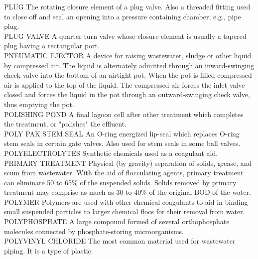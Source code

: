 \documentclass{article}
\begin{document}
PLUG
The rotating closure element of a plug valve. Also a threaded fitting used to close off and seal an opening into a pressure containing chamber, e.g., pipe plug.
\vspace{0.3cm}\\
PLUG VALVE
A quarter turn valve whose closure element is usually a tapered plug having a rectangular port.
\vspace{0.3cm}\\
PNEUMATIC EJECTOR
A device for raising wastewater, sludge or other liquid by compressed air. The liquid is alternately admitted through an inward-swinging check valve into the bottom of an airtight pot. When the pot is filled compressed air is applied to the top of the liquid. The compressed air forces the inlet valve closed and forces the liquid in the pot through an outward-swinging check valve, thus emptying the pot. 
\vspace{0.3cm}\\
POLISHING POND
A final lagoon cell after other treatment which completes the treatment, or "polishes" the effluent.
\vspace{0.3cm}\\
POLY PAK STEM SEAL
An O-ring energized lip-seal which replaces O-ring stem seals in certain gate valves. Also used for stem seals in some ball valves.
\vspace{0.3cm}\\
POLYELECTROLYTES
Synthetic chemicals used as a coagulant aid.
\vspace{0.3cm}\\
PRIMARY TREATMENT
Physical (by gravity) separation of solids, grease, and scum from wastewater. With the aid of flocculating agents, primary treatment can eliminate 50 to 65\% of the suspended solids. Solids removed by primary treatment may comprise as much as 30 to 40\% of the original BOD of the water.
\vspace{0.3cm}\\
POLYMER
Polymers are used with other chemical coagulants to aid in binding small suspended particles to larger chemical flocs for their removal from water.
\vspace{0.3cm}\\
POLYPHOSPHATE
A large compound formed of several orthophosphate molecules connected by phosphate-storing microorganisms.
\vspace{0.3cm}\\
POLYVINYL CHLORIDE
The most common material used for wastewater piping. It is a type of plastic.
\vspace{0.3cm}\\
\end{document}

